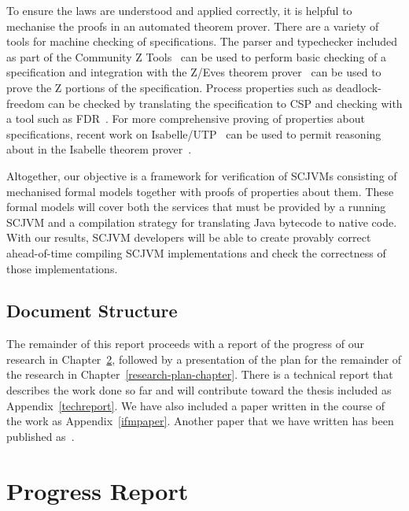 \documentclass[a4paper,10pt]{report}
\begin{document}
To ensure the laws are understood and applied correctly, it is helpful
to mechanise the proofs in an automated theorem prover.
There are a variety of tools for machine checking of \Circus{}
specifications.
The \Circus{} parser and typechecker included as part of the Community
Z Tools~\cite{malik2011, xavier2008, malik2005, miller2005} can be
used to perform basic checking of a \Circus{} specification and
integration with the Z/Eves theorem prover~\cite{saaltink1997} can be
used to prove the Z portions of the \Circus{} specification.
Process properties such as deadlock-freedom can be checked by
translating the \Circus{} specification to CSP and checking with a
tool such as FDR~\cite{gibson-robinson2014}.
For more comprehensive proving of properties about \Circus{}
specifications, recent work on Isabelle/UTP~\cite{foster2015} can be
used to permit reasoning about \Circus{} in the Isabelle theorem
prover~\cite{nipkow2002}.

Altogether, our objective is a framework for verification of SCJVMs
consisting of mechanised formal models together with proofs of
properties about them.
These formal models will cover both the services that must be provided
by a running SCJVM and a compilation strategy for translating Java
bytecode to native code.
With our results, SCJVM developers will be able to create provably
correct ahead-of-time compiling SCJVM implementations and check the
correctness of those implementations.


\section{Document Structure}
\label{document-structure-section}

The remainder of this report proceeds with a report of the progress of
our research in Chapter~\ref{progress-report-chapter}, followed by a
presentation of the plan for the remainder of the research in
Chapter~\ref{research-plan-chapter}.
There is a technical report that describes the work done so far and
will contribute toward the thesis included as
Appendix~\ref{techreport}.
We have also included a paper written in the course of the work as
Appendix~\ref{ifmpaper}.
Another paper that we have written has been published
as~\cite{baxter2015a}.

\chapter{Progress Report}
\label{progress-report-chapter}
\end{document}
